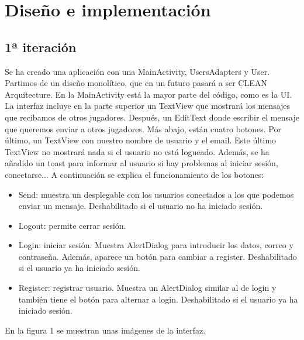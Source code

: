 \documentclass[a4paper,openright,12pt]{article}
\begin{document}
\section{Diseño e implementación}
\subsection{1ª iteración}
Se ha creado una aplicación con una MainActivity, UsersAdapters y User. Partimos de un diseño monolítico, que en un futuro pasará a ser CLEAN Arquitecture. En la MainActivity está la mayor parte del código, como es la UI. La interfaz incluye en la parte superior un TextView que mostrará los mensajes que recibamos de otros jugadores. Después, un EditText donde escribir el mensaje que queremos enviar a otros jugadores. Más abajo, están cuatro botones. Por último, un TextView con nuestro nombre de usuario y el email. Este último TextView no mostrará nada si el usuario no está logueado. Además, se ha añadido un toast para informar al usuario si hay problemas al iniciar sesión, conectarse...
A continuación se explica el funcionamiento de los botones:
\begin{itemize}
    \item Send: muestra un desplegable con los usuarios conectados a los que podemos enviar un mensaje. Deshabilitado si el usuario no ha iniciado sesión.
    \item Logout: permite cerrar sesión.
    \item Login: iniciar sesión. Muestra AlertDialog para introducir los datos, correo y contraseña. Además, aparece un botón para cambiar a register. Deshabilitado si el usuario ya ha iniciado sesión.
    \item Register: registrar usuario. Muestra un AlertDialog similar al de login y también tiene el botón para alternar a login. Deshabilitado si el usuario ya ha iniciado sesión.
\end{itemize}
En la figura 1 se muestran unas imágenes de la interfaz. 
\end{document}
